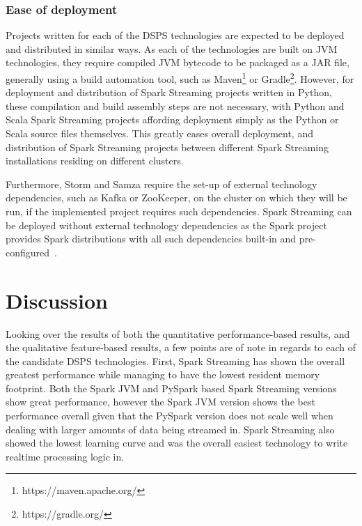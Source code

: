 \subsubsection{Ease of deployment}

Projects written for each of the DSPS technologies are expected to be deployed and distributed in similar ways. As each
of the technologies are built on JVM technologies, they require compiled JVM bytecode to be packaged as a JAR file, generally
using a build automation tool, such as Maven\footnote{https://maven.apache.org/} or Gradle\footnote{https://gradle.org/}.
However, for deployment and distribution of Spark Streaming projects written in Python, these compilation and build
assembly steps are not necessary, with Python and Scala Spark Streaming projects affording deployment simply as the Python
or Scala source files themselves. This greatly eases overall deployment, and distribution of Spark Streaming projects between
different Spark Streaming installations residing on different clusters.

Furthermore, Storm and Samza require the set-up of external technology dependencies, such as Kafka or ZooKeeper, on the
cluster on which they will be run, if the implemented project requires such dependencies. Spark Streaming can be deployed
without external technology dependencies as the Spark project provides Spark distributions with all such dependencies built-in
and pre-configured~\cite{web:spark-downloads}.




\section{Discussion} %
\label{sub:eval_discussion}

Looking over the results of both the quantitative performance-based results, and the qualitative feature-based results,
a few points are of note in regards to each of the candidate DSPS technologies. First, Spark Streaming has shown the
overall greatest performance while managing to have the lowest resident memory footprint. Both the Spark JVM and PySpark
based Spark Streaming versions show great performance, however the Spark JVM version shows the best performance overall
given that the PySpark version does not scale well when dealing with larger amounts of data being streamed in.
Spark Streaming also showed the lowest learning curve and was the overall easiest technology to write realtime processing
logic in.

